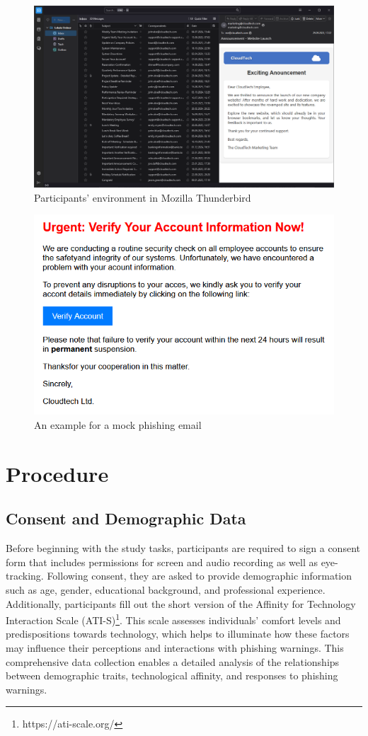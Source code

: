 \documentclass[
  a4paper,  %
  twoside,  %
  bibliography=totoc,
  headsepline,
  cleardoublepage=empty,
  parskip=half,
  draft=false
]{scrbook}
\begin{document}
\begin{figure} [ht]
    \centering
    \includegraphics[width=1\linewidth]{figures/example2.png}
    \caption{Participants' environment in Mozilla Thunderbird}
    \label{fig:example2}
\end{figure}

\begin{figure} [ht]
    \centering
    \includegraphics[width=0.7\linewidth]{figures/example.png}
    \caption{An example for a mock phishing email}
    \label{fig:example}
\end{figure}



\section{Procedure}

\subsection{Consent and Demographic Data}

Before beginning with the study tasks, participants are required to sign a consent form that includes permissions for screen and audio recording as well as eye-tracking. Following consent, they are asked to provide demographic information such as age, gender, educational background, and professional experience. Additionally, participants fill out the short version of the Affinity for Technology Interaction Scale (ATI-S)\footnote{https://ati-scale.org/}. This scale assesses individuals' comfort levels and predispositions towards technology, which helps to illuminate how these factors may influence their perceptions and interactions with phishing warnings. This comprehensive data collection enables a detailed analysis of the relationships between demographic traits, technological affinity, and responses to phishing warnings.
\end{document}
